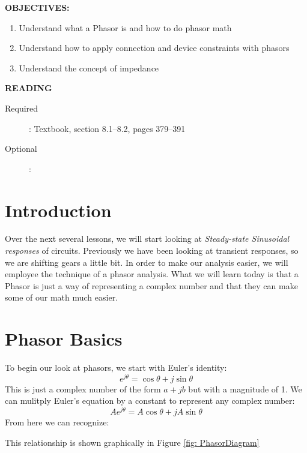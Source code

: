 \documentclass{handout}
\begin{document}
\maketitle

\textbf{OBJECTIVES:}
\begin{enumerate}
\item Understand what a Phasor is and how to do phasor math
\item Understand how to apply connection and device constraints with phasors
\item Understand the concept of impedance
\end{enumerate}

\textbf{READING}
\begin{description}
\item [Required]:
Textbook, section 8.1--8.2, pages 379--391
\item [Optional]:
\end{description}

\section{Introduction}
Over the next several lessons, we will start looking at {\em Steady-state Sinusoidal responses} of circuits.  Previously we have been looking at transient responses, so we are shifting gears a little bit.  In order to make our analysis easier, we will employee the technique of a phasor analysis.  What we will learn today is that a Phasor is just a way of representing a complex number and that they can make some of our math much easier.

\section{Phasor Basics}
To begin our look at phasors, we start with Euler's identity:
\[
e^{j\theta} = \cos \theta +j \sin \theta
\]
This is just a complex number of the form $a+jb$ but with a magnitude of 1.  We can mulitply  Euler's equation by a constant to represent any complex number:
\[
Ae^{j\theta} =A \cos \theta +j A\sin \theta
\]
From here we can recognize:
\soln{1.5in}{
\[
A\cos\theta = \mathbf{Re} [Ae^{j\theta}]
\]
\[
A\sin\theta = \mathbf{Im} [Ae^{j\theta}]
\]

}

This relationship is shown graphically in Figure \ref{fig: PhasorDiagram}
\end{document}
